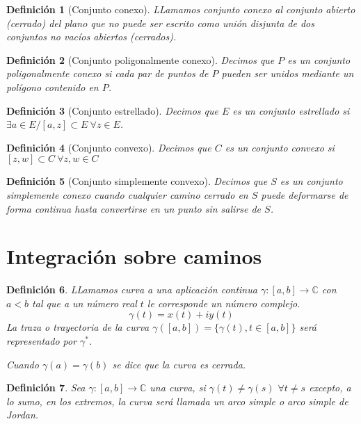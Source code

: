 \documentclass[12pt]{book}
\newtheorem{defi}{Definición}[chapter]
\newcommand{\C}{\mathbb{C}}
\begin{document}
\begin{defi}[Conjunto conexo]
LLamamos conjunto conexo al conjunto abierto (cerrado) del plano  que no puede ser escrito como unión disjunta de dos conjuntos no vacíos abiertos (cerrados).
\end{defi}

\begin{defi}[Conjunto poligonalmente conexo]
Decimos que $P$ es un conjunto poligonalmente conexo si cada par de puntos  de $P$ pueden ser unidos mediante un polígono contenido en $P$.
\end{defi}

\begin{defi}[Conjunto estrellado]
Decimos que $E$ es un conjunto estrellado si $\exists a\in E / [a,z]\subset E\ \forall z \in E$.
\end{defi}

\begin{defi}[Conjunto convexo]
Decimos que $C$ es un conjunto convexo si $[z,w]\subset C\ \forall z,w \in C$
\end{defi}

\begin{defi}[Conjunto simplemente convexo]
Decimos que $S$ es un conjunto simplemente conexo cuando cualquier camino cerrado en $S$ puede deformarse de forma continua hasta convertirse en un punto sin salirse de $S$.
\end{defi}

\section{Integración sobre caminos}

\begin{defi}
LLamamos curva a una aplicación continua $\gamma: [a,b] \longrightarrow \C$ con $a<b$ tal que a un número real $t$ le corresponde un número complejo.
$$\gamma(t) = x(t) + iy(t)$$
La traza o trayectoria de la curva $\gamma([a,b]) = \{\gamma(t), t\in[a,b]\}$ será representado por $\gamma^*$.

Cuando $\gamma(a) = \gamma(b)$ se dice que la curva es cerrada.
\end{defi}

\begin{defi}
Sea $\gamma:[a,b]\longrightarrow \C$ una curva, si $\gamma(t) \neq \gamma(s) $ $\forall t\neq s$ excepto, a lo sumo, en los extremos, la curva será llamada un arco simple o arco simple de Jordan.
\end{defi}
\end{document}
